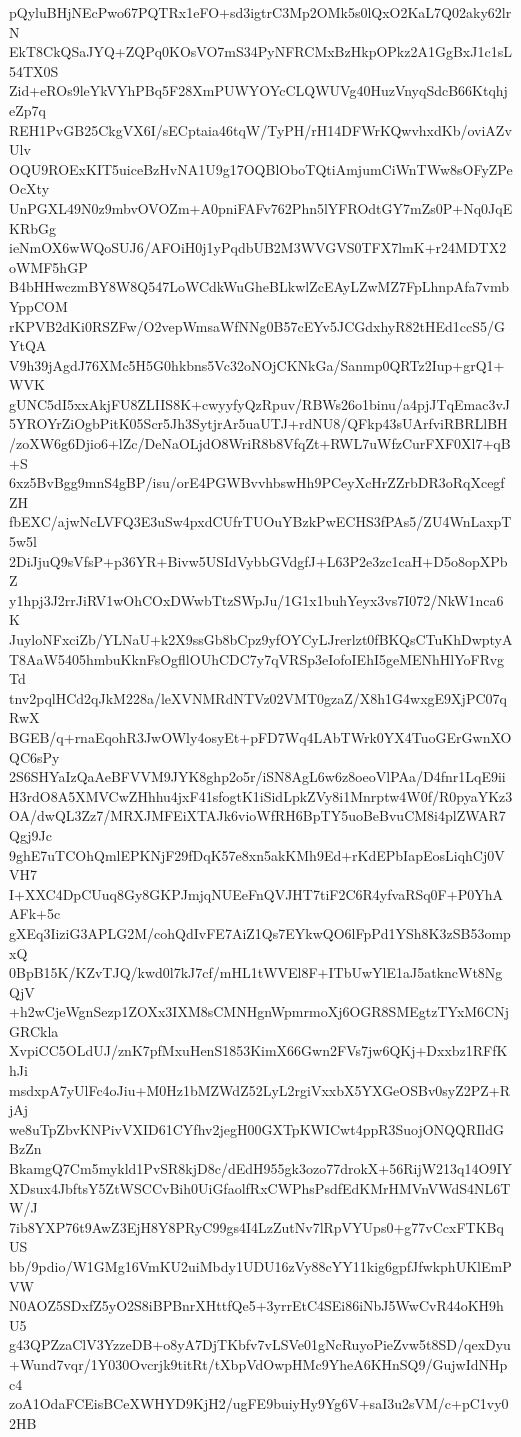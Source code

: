 pQyluBHjNEcPwo67PQTRx1eFO+sd3igtrC3Mp2OMk5s0lQxO2KaL7Q02aky62lrN
EkT8CkQSaJYQ+ZQPq0KOsVO7mS34PyNFRCMxBzHkpOPkz2A1GgBxJ1c1sL54TX0S
Zid+eROs9leYkVYhPBq5F28XmPUWYOYcCLQWUVg40HuzVnyqSdcB66KtqhjeZp7q
REH1PvGB25CkgVX6I/sECptaia46tqW/TyPH/rH14DFWrKQwvhxdKb/oviAZvUlv
OQU9ROExKIT5uiceBzHvNA1U9g17OQBlOboTQtiAmjumCiWnTWw8sOFyZPeOcXty
UnPGXL49N0z9mbvOVOZm+A0pniFAFv762Phn5lYFROdtGY7mZs0P+Nq0JqEKRbGg
ieNmOX6wWQoSUJ6/AFOiH0j1yPqdbUB2M3WVGVS0TFX7lmK+r24MDTX2oWMF5hGP
B4bHHwczmBY8W8Q547LoWCdkWuGheBLkwlZcEAyLZwMZ7FpLhnpAfa7vmbYppCOM
rKPVB2dKi0RSZFw/O2vepWmsaWfNNg0B57cEYv5JCGdxhyR82tHEd1ccS5/GYtQA
V9h39jAgdJ76XMc5H5G0hkbns5Vc32oNOjCKNkGa/Sanmp0QRTz2Iup+grQ1+WVK
gUNC5dI5xxAkjFU8ZLIIS8K+cwyyfyQzRpuv/RBWs26o1binu/a4pjJTqEmac3vJ
5YROYrZiOgbPitK05Scr5Jh3SytjrAr5uaUTJ+rdNU8/QFkp43sUArfviRBRLlBH
/zoXW6g6Djio6+lZc/DeNaOLjdO8WriR8b8VfqZt+RWL7uWfzCurFXF0Xl7+qB+S
6xz5BvBgg9mnS4gBP/isu/orE4PGWBvvhbswHh9PCeyXcHrZZrbDR3oRqXcegfZH
fbEXC/ajwNcLVFQ3E3uSw4pxdCUfrTUOuYBzkPwECHS3fPAs5/ZU4WnLaxpT5w5l
2DiJjuQ9sVfsP+p36YR+Bivw5USIdVybbGVdgfJ+L63P2e3zc1caH+D5o8opXPbZ
y1hpj3J2rrJiRV1wOhCOxDWwbTtzSWpJu/1G1x1buhYeyx3vs7I072/NkW1nca6K
JuyloNFxciZb/YLNaU+k2X9ssGb8bCpz9yfOYCyLJrerlzt0fBKQsCTuKhDwptyA
T8AaW5405hmbuKknFsOgfllOUhCDC7y7qVRSp3eIofoIEhI5geMENhHlYoFRvgTd
tnv2pqlHCd2qJkM228a/leXVNMRdNTVz02VMT0gzaZ/X8h1G4wxgE9XjPC07qRwX
BGEB/q+rnaEqohR3JwOWly4osyEt+pFD7Wq4LAbTWrk0YX4TuoGErGwnXOQC6sPy
2S6SHYaIzQaAeBFVVM9JYK8ghp2o5r/iSN8AgL6w6z8oeoVlPAa/D4fnr1LqE9ii
H3rdO8A5XMVCwZHhhu4jxF41sfogtK1iSidLpkZVy8i1Mnrptw4W0f/R0pyaYKz3
OA/dwQL3Zz7/MRXJMFEiXTAJk6vioWfRH6BpTY5uoBeBvuCM8i4plZWAR7Qgj9Jc
9ghE7uTCOhQmlEPKNjF29fDqK57e8xn5akKMh9Ed+rKdEPbIapEosLiqhCj0VVH7
I+XXC4DpCUuq8Gy8GKPJmjqNUEeFnQVJHT7tiF2C6R4yfvaRSq0F+P0YhAAFk+5c
gXEq3IiziG3APLG2M/cohQdIvFE7AiZ1Qs7EYkwQO6lFpPd1YSh8K3zSB53ompxQ
0BpB15K/KZvTJQ/kwd0l7kJ7cf/mHL1tWVEl8F+ITbUwYlE1aJ5atkncWt8NgQjV
+h2wCjeWgnSezp1ZOXx3IXM8sCMNHgnWpmrmoXj6OGR8SMEgtzTYxM6CNjGRCkla
XvpiCC5OLdUJ/znK7pfMxuHenS1853KimX66Gwn2FVs7jw6QKj+Dxxbz1RFfKhJi
msdxpA7yUlFc4oJiu+M0Hz1bMZWdZ52LyL2rgiVxxbX5YXGeOSBv0syZ2PZ+RjAj
we8uTpZbvKNPivVXID61CYfhv2jegH00GXTpKWICwt4ppR3SuojONQQRIldGBzZn
BkamgQ7Cm5mykld1PvSR8kjD8c/dEdH955gk3ozo77drokX+56RijW213q14O9IY
XDsux4JbftsY5ZtWSCCvBih0UiGfaolfRxCWPhsPsdfEdKMrHMVnVWdS4NL6TW/J
7ib8YXP76t9AwZ3EjH8Y8PRyC99gs4I4LzZutNv7lRpVYUps0+g77vCcxFTKBqUS
bb/9pdio/W1GMg16VmKU2uiMbdy1UDU16zVy88cYY11kig6gpfJfwkphUKlEmPVW
N0AOZ5SDxfZ5yO2S8iBPBnrXHttfQe5+3yrrEtC4SEi86iNbJ5WwCvR44oKH9hU5
g43QPZzaClV3YzzeDB+o8yA7DjTKbfv7vLSVe01gNcRuyoPieZvw5t8SD/qexDyu
+Wund7vqr/1Y030Ovcrjk9titRt/tXbpVdOwpHMc9YheA6KHnSQ9/GujwIdNHpc4
zoA1OdaFCEisBCeXWHYD9KjH2/ugFE9buiyHy9Yg6V+saI3u2sVM/c+pC1vy02HB
